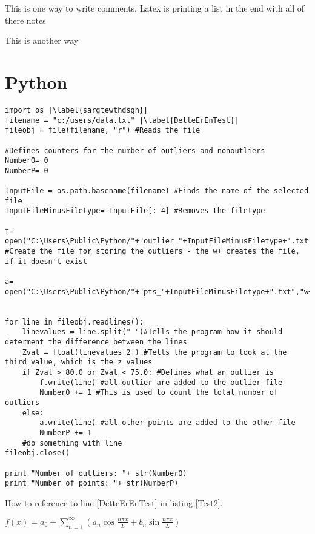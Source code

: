 This is one way to write comments. Latex is printing a list in the end with all of there notes

This is another way

\section{Python}

\begin{lstlisting}[language=iPython, caption={My Caption}, label= Test2,escapechar=|]
import os |\label{sargtewthdsgh}|
filename = "c:/users/data.txt" |\label{DetteErEnTest}|
fileobj = file(filename, "r") #Reads the file 

#Defines counters for the number of outliers and nonoutliers
NumberO= 0
NumberP= 0

InputFile = os.path.basename(filename) #Finds the name of the selected file
InputFileMinusFiletype= InputFile[:-4] #Removes the filetype

f= open("C:\Users\Public\Python/"+"outlier_"+InputFileMinusFiletype+".txt","w+") #Create the file for storing the outliers - the w+ creates the file, if it doesn't exist

a= open("C:\Users\Public\Python/"+"pts_"+InputFileMinusFiletype+".txt","w+")


for line in fileobj.readlines():
    linevalues = line.split(" ")#Tells the program how it should determent the difference between the lines
    Zval = float(linevalues[2]) #Tells the program to look at the third value, which is the z values
    if Zval > 80.0 or Zval < 75.0: #Defines what an outlier is
        f.write(line) #all outlier are added to the outlier file
        NumberO += 1 #This is used to count the total number of outliers
    else:
        a.write(line) #all other points are added to the other file
        NumberP += 1
    #do something with line
fileobj.close()

print "Number of outliers: "+ str(NumberO)
print "Number of points: "+ str(NumberP)
\end{lstlisting}

How to reference to line \ref{DetteErEnTest} in listing \ref{Test2}.


$f\left(x\right)=a_0+\sum_{n=1}^{\infty}\left(a_n\cos{\frac{n\pi x}{L}}+b_n\sin{\frac{n\pi x}{L}}\right)$